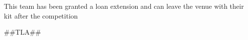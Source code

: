 \documentclass[a4paper, margin=0]{article}
\begin{document}
    \begin{center}

    \vspace*{\fill}

    \tiny{This team has been granted a loan extension and can leave the venue with their kit after the competition}

    \vspace{3cm}

    \huge{##TLA##}

    \vspace*{\fill}

\end{center}
\end{document}
